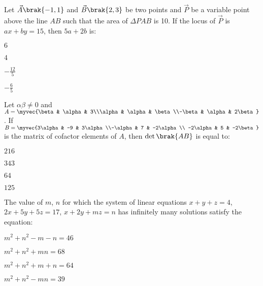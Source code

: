 \iffalse
\title{2024}
\author{EE24Btech11024 - G. Abhimanyu Koushik}
\section{mcq-single}
\fi

\item Let $\vec{A}\brak{-1,1}$ and $\vec{B}\brak{2,3}$ be two points and $\vec{P}$ be a variable point above the line $AB$ such that the area of $\Delta PAB$ is 10. If the locus of $\vec{P}$ is $ax+by=15$, then $5a+2b$ is:

\hfill{}
\begin{enumerate}
\begin{multicols}{4}
\item $6$
\item $4$
\item $-\frac{12}{5}$
\item $-\frac{6}{5}$
\end{multicols}
\end{enumerate}

\item Let $\alpha\beta\neq 0$ and $A=\myvec{\beta & \alpha & 3\\\alpha & \alpha & \beta\\-\beta & \alpha & 2\beta}$. If $B=\myvec{3\alpha & -9 & 3\alpha\\-\alpha & 7 & -2\alpha \\ -2\alpha & 5 & -2\beta}$ is the matrix of cofactor elements of $A$, then $\det\brak{AB}$ is equal to:

\hfill{}
\begin{enumerate}
\begin{multicols}{4}
\item $216$
\item $343$
\item $64$
\item $125$
\end{multicols}
\end{enumerate}

\item The value of $m$, $n$ for which the system of linear equations \newline $x+y+z=4$, \newline $2x+5y+5z=17$, \newline $x+2y+mz=n$ \newline has infinitely many solutions satisfy the equation:

\hfill{}
\begin{enumerate}
\begin{multicols}{2}
\item $m^2+n^2-m-n=46$	
\item $m^2+n^2+mn=68$
\item $m^2+n^2+m+n=64$
\item $m^2+n^2-mn=39$
\end{multicols}
\end{enumerate}

